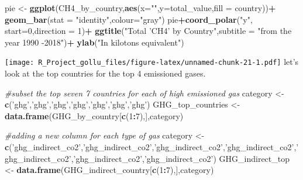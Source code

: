 \documentclass[
]{article}
\newenvironment{Shaded}{\begin{snugshade}}{\end{snugshade}}
\newcommand{\CommentTok}[1]{\textcolor[rgb]{0.56,0.35,0.01}{\textit{#1}}}
\newcommand{\DataTypeTok}[1]{\textcolor[rgb]{0.13,0.29,0.53}{#1}}
\newcommand{\DecValTok}[1]{\textcolor[rgb]{0.00,0.00,0.81}{#1}}
\newcommand{\KeywordTok}[1]{\textcolor[rgb]{0.13,0.29,0.53}{\textbf{#1}}}
\newcommand{\NormalTok}[1]{#1}
\newcommand{\OperatorTok}[1]{\textcolor[rgb]{0.81,0.36,0.00}{\textbf{#1}}}
\newcommand{\StringTok}[1]{\textcolor[rgb]{0.31,0.60,0.02}{#1}}
\begin{document}
\begin{Shaded}
\begin{Highlighting}[]
\NormalTok{pie <-}\StringTok{ }\KeywordTok{ggplot}\NormalTok{(CH4_by_country,}\KeywordTok{aes}\NormalTok{(}\DataTypeTok{x=}\StringTok{""}\NormalTok{,}\DataTypeTok{y=}\NormalTok{total_value,}\DataTypeTok{fill =}\NormalTok{ country))}\OperatorTok{+}
\StringTok{  }\KeywordTok{geom_bar}\NormalTok{(}\DataTypeTok{stat =} \StringTok{"identity"}\NormalTok{,}\DataTypeTok{colour=}\StringTok{"gray"}\NormalTok{)}
\NormalTok{pie}\OperatorTok{+}\KeywordTok{coord_polar}\NormalTok{(}\StringTok{"y"}\NormalTok{, }\DataTypeTok{start=}\DecValTok{0}\NormalTok{,}\DataTypeTok{direction =} \DecValTok{1}\NormalTok{)}\OperatorTok{+}
\StringTok{  }\KeywordTok{ggtitle}\NormalTok{(}\StringTok{"Total 'CH4' by Country"}\NormalTok{,}\DataTypeTok{subtitle =} \StringTok{"from the year 1990 -2018"}\NormalTok{)}\OperatorTok{+}
\StringTok{  }\KeywordTok{ylab}\NormalTok{(}\StringTok{"In kilotons equivalent"}\NormalTok{)}
\end{Highlighting}
\end{Shaded}

\texttt{[image: R\_Project\_gollu\_files/figure-latex/unnamed-chunk-21-1.pdf]}
let's look at the top countries for the top 4 emissioned gases.

\begin{Shaded}
\begin{Highlighting}[]
\CommentTok{#subset the top seven 7 countries for each of high emissioned gas}
\NormalTok{category <-}\StringTok{ }\KeywordTok{c}\NormalTok{(}\StringTok{'ghg'}\NormalTok{,}\StringTok{'ghg'}\NormalTok{,}\StringTok{'ghg'}\NormalTok{,}\StringTok{'ghg'}\NormalTok{,}\StringTok{'ghg'}\NormalTok{,}\StringTok{'ghg'}\NormalTok{,}\StringTok{'ghg'}\NormalTok{)}
\NormalTok{GHG_top_countries <-}\StringTok{ }\KeywordTok{data.frame}\NormalTok{(GHG_by_country[}\KeywordTok{c}\NormalTok{(}\DecValTok{1}\OperatorTok{:}\DecValTok{7}\NormalTok{),],category)}
\end{Highlighting}
\end{Shaded}

\begin{Shaded}
\begin{Highlighting}[]
\CommentTok{#adding a new column for each type of gas }
\NormalTok{category <-}\StringTok{ }\KeywordTok{c}\NormalTok{(}\StringTok{'ghg_indirect_co2'}\NormalTok{,}\StringTok{'ghg_indirect_co2'}\NormalTok{,}\StringTok{'ghg_indirect_co2'}\NormalTok{,}\StringTok{'ghg_indirect_co2'}\NormalTok{,}\StringTok{'ghg_indirect_co2'}\NormalTok{,}\StringTok{'ghg_indirect_co2'}\NormalTok{,}\StringTok{'ghg_indirect_co2'}\NormalTok{)}
\NormalTok{GHG_indirect_top <-}\StringTok{ }\KeywordTok{data.frame}\NormalTok{(GHG_indirect_country[}\KeywordTok{c}\NormalTok{(}\DecValTok{1}\OperatorTok{:}\DecValTok{7}\NormalTok{),],category)}
\end{Highlighting}
\end{Shaded}
\end{document}
